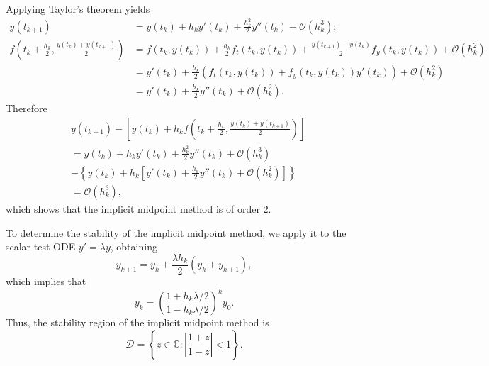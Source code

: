 \documentclass[a4paper]{book}
\makeatletter
\newenvironment{sol}[1][\solname]{\par
  \pushQED{\qed}
  \normalfont \topsep6\p@\@plus6\p@\relax
  \trivlist
  \item[\hskip\labelsep
        \itshape
    #1\@addpunct{.}]\ignorespaces
}{\popQED\endtrivlist\@endpefalse}
\providecommand{\solname}{Solution}
\numberwithin{equation}{chapter}
\theoremstyle{definition}
\makeatother
\begin{document}
  \begin{sol}
    Applying Taylor's theorem yields
    \begin{align*}
      y(t_{k+1}) &= y(t_k) + h_ky'(t_k) + \frac{h_k^2}{2}y''(t_k) +
      \mathcal{O}(h_k^3); \\
      f\left( t_k+\frac{h_k}{2}, \frac{y(t_k)+y(t_{k+1})}{2}\right) &= f(t_k, y(t_k)) +
                                                               \frac{h_k}{2}f_t(t_k, y(t_k)) +
                                                               \frac{y(t_{k+1})-y(t_k)}{2}f_y(t_k, y(t_k)) + \mathcal{O}(h_k^2) \\
                 &= y'(t_k) + \frac{h_k}{2}\left( f_t(t_k, y(t_k))+f_y(t_k,y(t_k))y'(t_k)\right)
                   + \mathcal{O}(h_k^2) \\
      &= y'(t_k) + \frac{h_k}{2}y''(t_k) + \mathcal{O}(h_k^2).
    \end{align*}
    Therefore
    \begin{align*}
      &y(t_{k+1}) - \left[y(t_k)+h_kf\left( t_k+\frac{h_k}{2}, \frac{y(t_k)+y(t_{k+1})}{2}\right)\right] \\
       &=
        y(t_k) + h_ky'(t_k) + \frac{h_k^2}{2}y''(t_k) +
        \mathcal{O}(h_k^3) \\
        &- \left\{y(t_k) + h_k\left[y'(t_k) + \frac{h_k}{2}y''(t_k) + \mathcal{O}(h_k^2)\right]\right\}
      \\
      &= \mathcal{O}(h_k^3),
    \end{align*}
    which shows that the implicit midpoint method is of order $2$.
  
    To determine the stability of the implicit midpoint method,
    we apply it to the scalar test ODE $y'=\lambda y$,
    obtaining
    \begin{displaymath}
      y_{k+1} = y_k + \frac{\lambda h_k}{2}(y_k+y_{k+1}),
    \end{displaymath}
    which implies that
    \begin{displaymath}
      y_k = \left( \frac{1+h_k\lambda/2}{1-h_k\lambda/2}\right)^ky_0.
    \end{displaymath}
    Thus, the stability region of the implicit midpoint method is
    \begin{displaymath}
      \mathcal{D} = \left\{z\in\mathbb{C}: \left| \frac{1+z}{1-z}\right|<1\right\}.
    \end{displaymath}
  \end{sol}  
\end{document}
